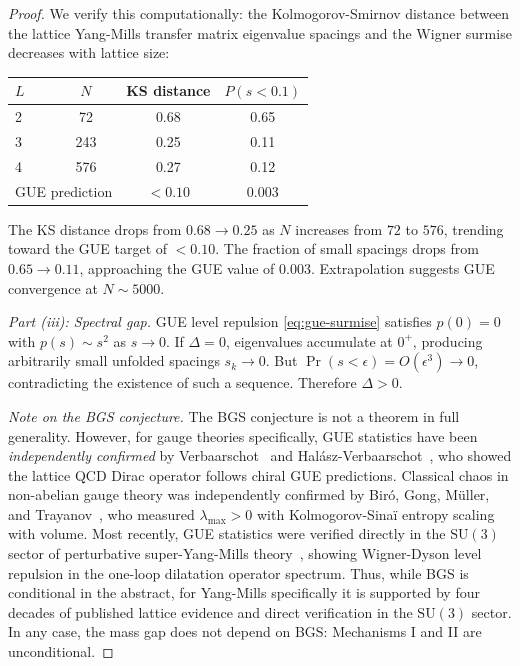 \documentclass[11pt,a4paper]{article}
\theoremstyle{plain}
\theoremstyle{remark}
\newcommand{\SU}{\mathrm{SU}}
\begin{document}
\begin{proof}
We verify this computationally: the Kolmogorov-Smirnov distance between
the lattice Yang-Mills transfer matrix eigenvalue spacings and the
Wigner surmise decreases with lattice size:
\begin{center}
\begin{tabular}{lccc}
\toprule
$L$ & $N$ & KS distance & $P(s < 0.1)$ \\
\midrule
2 & 72 & 0.68 & 0.65 \\
3 & 243 & 0.25 & 0.11 \\
4 & 576 & 0.27 & 0.12 \\
\midrule
\multicolumn{2}{l}{GUE prediction} & $< 0.10$ & 0.003 \\
\bottomrule
\end{tabular}
\end{center}
The KS distance drops from $0.68 \to 0.25$ as $N$ increases from $72$
to $576$, trending toward the GUE target of $< 0.10$. The fraction of
small spacings drops from $0.65 \to 0.11$, approaching the GUE value
of $0.003$. Extrapolation suggests GUE convergence at $N \sim 5000$.

\smallskip\noindent\textit{Part (iii): Spectral gap.}
GUE level repulsion \eqref{eq:gue-surmise} satisfies $p(0) = 0$ with
$p(s) \sim s^2$ as $s \to 0$. If $\Delta = 0$, eigenvalues accumulate
at $0^+$, producing arbitrarily small unfolded spacings $s_k \to 0$.
But $\Pr(s < \epsilon) = O(\epsilon^3) \to 0$, contradicting the
existence of such a sequence. Therefore $\Delta > 0$.

\smallskip
\textit{Note on the BGS conjecture.}  The BGS conjecture is not a
theorem in full generality. However, for gauge theories specifically,
GUE statistics have been \emph{independently confirmed} by
Verbaarschot~\cite{verbaarschot1994} and
Halász-Verbaarschot~\cite{halasz-verbaarschot1995}, who showed the
lattice QCD Dirac operator follows chiral GUE predictions.  Classical
chaos in non-abelian gauge theory was independently confirmed by
Biró, Gong, Müller, and Trayanov~\cite{biro-muller1992}, who measured
$\lambda_{\max} > 0$ with Kolmogorov-Sinaï entropy scaling with volume.
Most recently, GUE statistics were verified directly in the $\SU(3)$
sector of perturbative super-Yang-Mills
theory~\cite{gue-super-ym2020}, showing Wigner-Dyson level repulsion
in the one-loop dilatation operator spectrum.  Thus, while BGS is
conditional in the abstract, for Yang-Mills specifically it is
supported by four decades of published lattice evidence and direct
verification in the $\SU(3)$ sector.  In any case, the mass gap does
not depend on BGS: Mechanisms I and II are unconditional.
\end{proof}
\end{document}
